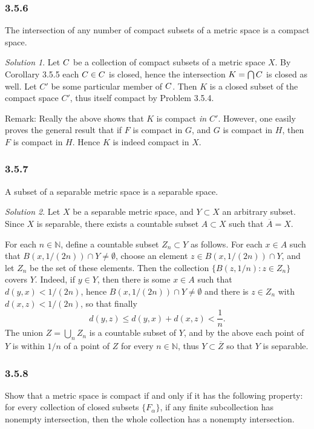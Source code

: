 \documentclass{report}
\newcommand{\bb}[1]{\mathbb{#1}}
\let\sc\relax
\newcommand{\sc}[1]{\mathscr{#1}}
\theoremstyle{remark}
\newtheorem*{solution}{Solution}
\begin{document}
\subsubsection*{3.5.6}
The intersection of any number of compact subsets of a metric space is a compact space.

\begin{solution}
  Let $\sc C$ be a collection of compact subsets of a metric space $X$. By Corollary 3.5.5 each $C \in \sc C$ is closed, hence the intersection $K = \bigcap \sc C$ is closed as well. Let $C'$ be some particular member of $\sc C$. Then $K$ is a closed subset of the compact space $C'$, thus itself compact by Problem 3.5.4.

  Remark: Really the above shows that $K$ is compact \emph{in $C'$}. However, one easily proves the general result that if $F$ is compact in $G$, and $G$ is compact in $H$, then $F$ is compact in $H$. Hence $K$ is indeed compact in $X$.
\end{solution}

\subsubsection*{3.5.7}
A subset of a separable metric space is a separable space.

\begin{solution}
  Let $X$ be a separable metric space, and $Y \subset X$ an arbitrary subset. Since $X$ is separable, there exists a countable subset $A \subset X$ such that $\overline A = X$.

  For each $n \in \bb N$, define a countable subset $Z_n \subset Y$ as follows. For each $x \in A$ such that $B(x,1/(2n)) \cap Y \ne \emptyset$, choose an element $z \in B(x,1/(2n)) \cap Y$, and let $Z_n$ be the set of these elements. Then the collection $\{B(z,1/n): z \in Z_n\}$ covers $Y$. Indeed, if $y \in Y$, then there is some $x \in A$ such that $d(y,x) < 1/(2n)$, hence $B(x,1/(2n)) \cap Y \ne \emptyset$ and there is $z \in Z_n$ with $d(x,z) < 1/(2n)$, so that finally
  \begin{equation*}
    d(y,z) \le d(y,x) + d(x,z) < \frac{1}{n}.
  \end{equation*}
  The union $Z = \bigcup_n Z_n$ is a countable subset of $Y$, and by the above each point of $Y$ is within $1/n$ of a point of $Z$ for every $n \in \bb N$, thus $Y \subset \overline Z$ so that $Y$ is separable.
\end{solution}

\subsubsection{3.5.8}
Show that a metric space is compact if and only if it has the following property: for every collection of closed subsets $\{F_\alpha\}$, if any finite subcollection has nonempty intersection, then the whole collection has a nonempty intersection.
\end{document}
